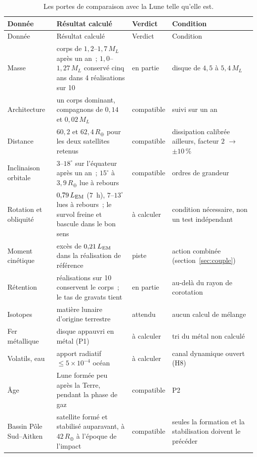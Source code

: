 \documentclass[11pt,a4paper]{article}
\newcommand{\Rt}{\ensuremath{R_\oplus}}
\newcommand{\ML}{\ensuremath{M_L}}
\newcommand{\LEM}{\ensuremath{L_{\rm EM}}}
\renewcommand{\arraystretch}{1.12}
\begin{document}
{\footnotesize\renewcommand{\arraystretch}{0.9}
\begin{longtable}{>{\raggedright\arraybackslash}p{2.4cm}>{\raggedright\arraybackslash}p{6.6cm}>{\raggedright\arraybackslash}p{2.0cm}>{\raggedright\arraybackslash}p{3.4cm}}
\caption{Les portes de comparaison avec la Lune telle qu'elle est.\label{tab:portes}}\\
\toprule
Donnée & Résultat calculé & Verdict & Condition \\
\midrule
\endfirsthead
\toprule
Donnée & Résultat calculé & Verdict & Condition \\
\midrule
\endhead
\bottomrule
\endlastfoot
Masse & corps de $1{,}2$--$1{,}7\,\ML$ après un an~; $1{,}0$--$1{,}27\,\ML$ conservé cinq ans dans 4 réalisations sur 10 & en partie & disque de $4{,}5$ à $5{,}4\,\ML$ \\
Architecture & un corps dominant, compagnons de $0{,}14$ et $0{,}02\,\ML$ & compatible & suivi sur un an \\
Distance & $60{,}2$ et $62{,}4\,\Rt$ pour les deux satellites retenus & compatible & dissipation calibrée ailleurs, facteur $2$ $\to$ $\pm10\,\%$ \\
Inclinaison orbitale & $3$--$18^\circ$ sur l'équateur après un an~; $15^\circ$ à $3{,}9\,\Rt$ lue à rebours & compatible & ordres de grandeur \\
Rotation et obliquité & $0{,}79\,\LEM$ ($7$~h), $7$--$13^\circ$ lues à rebours~; le survol freine et bascule dans le bon sens & à calculer & condition nécessaire, non un test indépendant \\
Moment cinétique & excès de $0{,}21\,\LEM$ dans la réalisation de référence & piste & action combinée (section~\ref{sec:couple}) \\
Rétention & 4 réalisations sur 10 conservent le corps~; le tas de gravats tient & en partie & au-delà du rayon de corotation \\
Isotopes & matière lunaire d'origine terrestre & attendu & aucun calcul de mélange \\
Fer métallique & disque appauvri en métal (P1) & à calculer & tri du métal non calculé \\
Volatils, eau & apport radiatif $\le5\times10^{-4}$ océan & à calculer & canal dynamique ouvert (H8) \\
Âge & Lune formée peu après la Terre, pendant la phase de gaz & compatible & P2 \\
Bassin Pôle Sud--Aitken & satellite formé et stabilisé auparavant, à $42\,\Rt$ à l'époque de l'impact & compatible & seules la formation et la stabilisation doivent le précéder \\
\end{longtable}}
\end{document}
